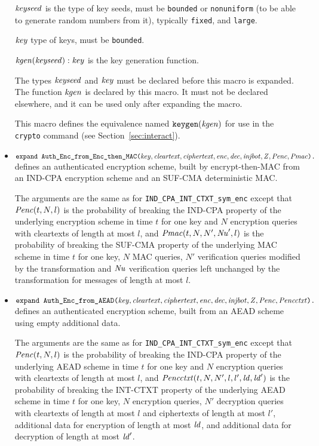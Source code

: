 \documentclass{article}
\begin{document}
\begin{itemize}
$\mathit{keyseed}$ is the type of key seeds, must be \texttt{bounded} or \texttt{nonuniform} (to be able to generate random numbers from it), typically \texttt{fixed}, and \texttt{large}.

$\mathit{key}$ type of keys, must be \texttt{bounded}.

$\mathit{kgen}(\mathit{keyseed}): \mathit{key}$ is the key generation function.

The types $\mathit{keyseed}$ and $\mathit{key}$ must be declared before this
macro is expanded. The function $\mathit{kgen}$ is declared by this
macro. It must not be declared elsewhere, and it can be used only
after expanding the macro.

This macro defines the equivalence named $\texttt{keygen}(\mathit{kgen})$
   for use in the \texttt{crypto} command 
   (see Section~\ref{sec:interact}).

\item
  $\texttt{expand\ Auth\_Enc\_from\_Enc\_then\_MAC(}\vn{key}, \vn{cleartext}, \vn{ciphertext}, \vn{enc}, \vn{dec}, \vn{injbot}, \vn{Z}, \vn{Penc}, \vn{Pmac}\texttt{).}$ defines an authenticated encryption scheme, built by encrypt-then-MAC from an IND-CPA encryption scheme and an SUF-CMA deterministic MAC.

  The arguments are the same as for \texttt{IND\_CPA\_INT\_CTXT\_sym\_enc} except that $\mathit{Penc}(t, N, l)$ is the probability of breaking the IND-CPA
  property of the underlying encryption scheme in time $t$ for one key and $N$ encryption queries with
  cleartexts of length at most $l$, and
  $\mathit{Pmac}(t, N, N', \mathit{Nu}', l)$ is the probability of breaking the SUF-CMA
   property of the underlying MAC scheme in time $t$ for one key, $N$ MAC queries, $N'$ verification
   queries modified by the transformation and $\mathit{Nu}$ verification
   queries left unchanged by the transformation for messages of length at most $l$.

 \item 
   $\texttt{expand\ Auth\_Enc\_from\_AEAD(}\vn{key}, \vn{cleartext},
   \vn{ciphertext}, \vn{enc}, \vn{dec}, \vn{injbot}, \vn{Z},
   \vn{Penc}, \vn{Pencctxt}\texttt{).}$ defines an authenticated
   encryption scheme, built from an AEAD scheme using empty additional
   data.

   The arguments are the same as for
   \texttt{IND\_CPA\_INT\_CTXT\_sym\_enc} except that $\mathit{Penc}(t, N,
   l)$ is the probability of breaking the IND-CPA property of the
   underlying AEAD scheme in time $t$ for one key and $N$ encryption
   queries with cleartexts of length at most $l$, and
   $\mathit{Pencctxt}(t, N, N', l, l', \mathit{ld}, \mathit{ld}')$ is the
   probability of breaking the INT-CTXT property of the underlying
   AEAD scheme in time $t$ for one key, $N$ encryption queries, $N'$
   decryption queries with cleartexts of length at most $l$ and
   ciphertexts of length at most $l'$, additional data for encryption
   of length at most $\mathit{ld}$, and additional data for decryption of
   length at most $\mathit{ld}'$.
   

\end{itemize}
\end{document}
